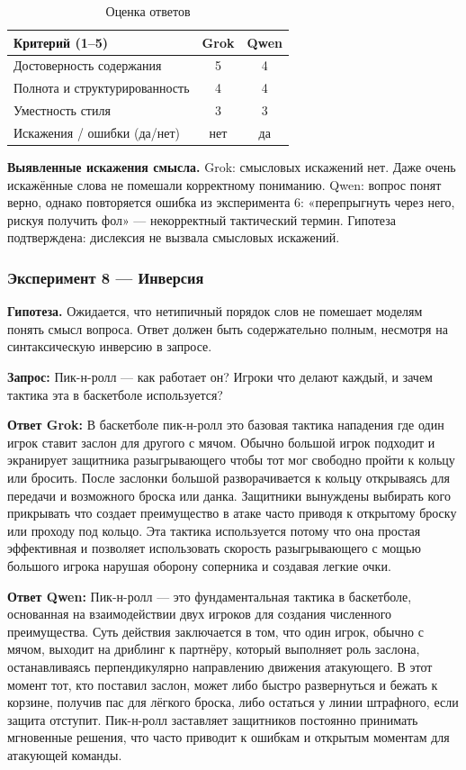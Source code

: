 \documentclass[a4paper, final]{article}
\newcommand{\scoretablefilled}[8]{%
    \vspace{4pt}
    \begin{table}[h!]
    \centering
    \small
    \begin{tabular}{|l|c|c|}
    \hline
    \textbf{Критерий (1--5)} & \textbf{Grok} & \textbf{Qwen} \\
    \hline
    Достоверность содержания & #1 & #2 \\
    \hline
    Полнота и структурированность & #3 & #4 \\
    \hline
    Уместность стиля & #5 & #6 \\
    \hline
    Искажения / ошибки (да/нет) & #7 & #8 \\
    \hline
    \end{tabular}
    \caption{Оценка ответов}
    \end{table}
    \vspace{2pt}
}
\begin{document}
\scoretablefilled{5}{4}{4}{4}{3}{3}{нет}{да}

\noindent\textbf{Выявленные искажения смысла.} Grok: смысловых искажений нет. Даже очень искажённые слова не помешали корректному пониманию. Qwen: вопрос понят верно, однако повторяется ошибка из эксперимента 6: «перепрыгнуть через него, рискуя получить фол» — некорректный тактический термин. Гипотеза подтверждена: дислексия не вызвала смысловых искажений.

\newpage

\subsubsection{Эксперимент 8 — Инверсия}

\noindent\textbf{Гипотеза.} Ожидается, что нетипичный порядок слов не помешает моделям понять смысл вопроса. Ответ должен быть содержательно полным, несмотря на синтаксическую инверсию в запросе.

\noindent\textbf{Запрос:} Пик-н-ролл — как работает он? Игроки что делают каждый, и зачем тактика эта в баскетболе используется?

\noindent\textbf{Ответ Grok:} В баскетболе пик-н-ролл это базовая тактика нападения где один игрок ставит заслон для другого с мячом. Обычно большой игрок подходит и экранирует защитника разыгрывающего чтобы тот мог свободно пройти к кольцу или бросить. После заслонки большой разворачивается к кольцу открываясь для передачи и возможного броска или данка. Защитники вынуждены выбирать кого прикрывать что создает преимущество в атаке часто приводя к открытому броску или проходу под кольцо. Эта тактика используется потому что она простая эффективная и позволяет использовать скорость разыгрывающего с мощью большого игрока нарушая оборону соперника и создавая легкие очки.

\noindent\textbf{Ответ Qwen:} Пик-н-ролл — это фундаментальная тактика в баскетболе, основанная на взаимодействии двух игроков для создания численного преимущества. Суть действия заключается в том, что один игрок, обычно с мячом, выходит на дриблинг к партнёру, который выполняет роль заслона, останавливаясь перпендикулярно направлению движения атакующего. В этот момент тот, кто поставил заслон, может либо быстро развернуться и бежать к корзине, получив пас для лёгкого броска, либо остаться у линии штрафного, если защита отступит. Пик-н-ролл заставляет защитников постоянно принимать мгновенные решения, что часто приводит к ошибкам и открытым моментам для атакующей команды.
\end{document}
